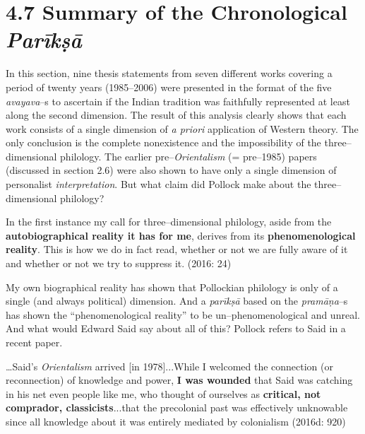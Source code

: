 \vspace{-.5cm}

\section*{4.7 Summary of the Chronological {\it {\bfseries Parīkṣā}}}


\vspace{-.2cm}

In this section, nine thesis statements from seven different works covering a period of twenty years (1985–2006) were presented in the format of the five \textit{avayava}–s to ascertain if the Indian tradition was faithfully represented at least along the second dimension. The result of this analysis clearly shows that each work consists of a single dimension of \textit{a priori} application of Western theory. The only conclusion is the complete nonexistence and the impossibility of the three–dimensional philology. The earlier pre–\textit{Orientalism} (= pre–1985) papers (discussed in section 2.6) were also shown to have only a single dimension of personalist \textit{interpretation}. But what claim did Pollock make about the three–dimensional philology?

\begin{myquote}
In the first instance my call for three–dimensional philology, aside from the \textbf{autobiographical reality it has for me}, derives from its \textbf{phenomenological reality}. This is how we do in fact read, whether or not we are fully aware of it and whether or not we try to suppress it. (2016: 24)
\end{myquote}

My own biographical reality has shown that Pollockian philology is only of a single (and always political) dimension. And a \textit{parīkṣā} based on the \textit{pramāṇa}–s has shown the “phenomenological reality” to be un–phenomenological and unreal. And what would Edward Said say about all of this? Pollock refers to Said in a recent paper.

\begin{myquote}
…Said’s \textit{Orientalism} arrived [in 1978]...While I welcomed the connection (or reconnection) of knowledge and power, \textbf{I was wounded} that Said was catching in his net even people like me, who thought of ourselves as \textbf{critical, not comprador, classicists}...that the precolonial past was effectively unknowable since all knowledge about it was entirely mediated by colonialism (2016d: 920)
\end{myquote}


